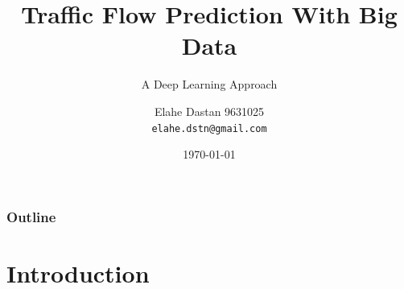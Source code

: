 \documentclass{beamer}
\author[Elahe Dastan]{%
  Elahe Dastan\hfill
  9631025\\
  \texttt{elahe.dstn@gmail.com}
}
\title{Traffic Flow Prediction With Big Data}
\subtitle{A Deep Learning Approach}
\institute[AUT]{Machine Learning\\Amirkabir University of Technology}
\date{\minimaldate\today}
\begin{document}
\begin{frame}
  \titlepage{}
\end{frame}
\begin{frame}
	\frametitle{Outline}
	\tableofcontents{}
\end{frame}

\section{Introduction}

\end{document}

